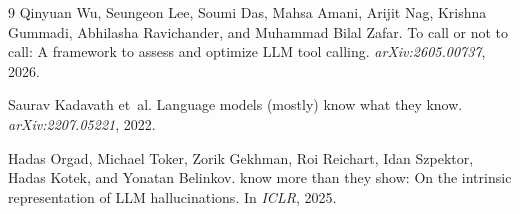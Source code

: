 \documentclass[10pt,twocolumn,a4paper]{article}
\begin{document}
\small
\begin{thebibliography}{9}
Qinyuan Wu, Seungeon Lee, Soumi Das, Mahsa Amani, Arijit Nag, Krishna Gummadi, Abhilasha Ravichander, and Muhammad Bilal Zafar.
\newblock To call or not to call: A framework to assess and optimize {LLM} tool calling.
\newblock \emph{arXiv:2605.00737}, 2026.

Saurav Kadavath et~al.
\newblock Language models (mostly) know what they know.
\newblock \emph{arXiv:2207.05221}, 2022.

Hadas Orgad, Michael Toker, Zorik Gekhman, Roi Reichart, Idan Szpektor, Hadas Kotek, and Yonatan Belinkov.
 know more than they show: On the intrinsic representation of {LLM} hallucinations.
\newblock In \emph{ICLR}, 2025.
\end{thebibliography}
\end{document}
